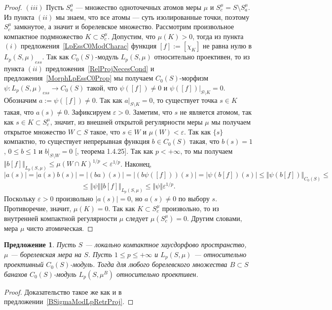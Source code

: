 \documentclass[12pt]{article}
\newtheorem{proposition}[theorem]{Предложение}
\begin{document}
\begin{proof}
    $(iii)$ Пусть $S_a^\mu$ --- множество одноточечных атомов меры $\mu$ и
    $S_c^\mu=S\setminus S_a^\mu$. Из пункта $(ii)$ мы знаем, что все атомы ---
    суть изолированные точки, поэтому $S_c^\mu$ замкнутое, а значит и
    борелевское множество. Рассмотрим произвольное компактное подмножество
    $K\subset S_c^\mu$. Допустим, что $\mu(K)>0$, тогда из пункта $(i)$
    предложения~\ref{LpEssC0ModCharac} функция $[f]:=[\chi_K]$ не равна нулю в
    ${L_p(S,\mu)}_{ess}$. Так как $C_0(S)$-модуль $L_p(S, \mu)$ относительно
    проективен, то из пункта $(ii)$ предложения~\ref{RelProjNecesCond} и
    предложения~\ref{MorphLpEssC0Prop} мы получаем $C_0(S)$-морфизм
    $\psi:{L_p(S,\mu)}_{ess}\to C_0(S)$ такой, что $\psi([f])\neq 0$ и
    $\psi([f])|_{S\setminus K}=0$. Обозначим $a:=\psi([f])\neq 0$. Так как
    $a|_{S\setminus K}=0$, то существует точка $s\in K$ такая, что $a(s)\neq 0$.
    Зафиксируем $\varepsilon > 0$. Заметим, что $s$ не является атомом, так как
    $s\in K\subset S_c^\mu$, значит, из внешней открытой регулярности меры $\mu$
    мы получаем открытое множество $W\subset S$ такое, что $s\in W$ и
    $\mu(W)<\varepsilon$. Так как $\{s\}$ компактно, то существует непрерывная
    функция $b\in C_0(S)$ такая, что $b(s)=1$, $0\leq b\leq 1$ и $b|_{S\setminus
        W}=0$ [\cite{DalesBanSpContFunDualSp}, теорема 1.4.25]. Так как $p<+\infty$,
    то мы получаем $\Vert b[f]\Vert_{L_p(S,\mu)} \leq {\mu(W\cap
            K)}^{1/p}<\varepsilon^{1/p}$. Наконец,
    $$
        |a(s)|=|a(s)b(s)|=|(ba)(s)|=|(b\psi([f]))(s)|
        =|\psi(b[f])(s)|\leq\Vert \psi (b[f])\Vert_{C_0(S)}\leq
    $$
    $$
        \leq\Vert\psi\Vert\Vert b[f]\Vert_{L_p(S,\mu)}
        \leq\Vert\psi\Vert\varepsilon^{1/p}.
    $$
    Поскольку $\varepsilon>0$ произвольно $|a(s)|=0$, но $a(s)\neq 0$ по выбору
    $s$. Противоречие, значит, $\mu(K)=0$. Так как $K\subset S_c^\mu$
    произвольно, то из внутренней компактной регулярности $\mu$ следует
    $\mu(S_c^\mu)=0$. Другим словами, мера $\mu$ чисто атомическая.
\end{proof}

\begin{proposition}\label{C0ModLpRetrProj} Пусть $S$ --- локально компактное
    хаусдорфово пространство, $\mu$ --- борелевская мера на $S$. Пусть $1\leq
        p\leq +\infty$ и $L_p(S,\mu)$ --- относительно проективный $C_0(S)$-модуль.
    Тогда для любого борелевского множества $B\subset S$ банахов $C_0(S)$-модуль
    $L_p(S,\mu^B)$ относительно проективен.
\end{proposition}
\begin{proof} Доказательство такое же как и в
    предложении~\ref{BSigmaModLpRetrProj}.
\end{proof}
\end{document}
